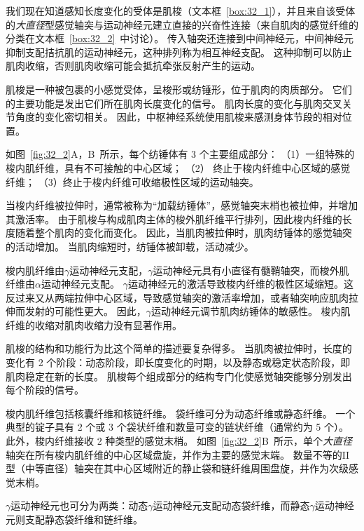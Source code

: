 我们现在知道感知长度变化的受体是肌梭（文本框~\ref{box:32_1}），并且来自该受体的\textit{大直径}型感觉轴突与运动神经元建立直接的兴奋性连接（来自肌肉的感觉纤维的分类在文本框~\ref{box:32_2}~中讨论）。
传入轴突还连接到中间神经元，中间神经元抑制支配拮抗肌的运动神经元，这种排列称为相互神经支配。
这种抑制可以防止肌肉收缩，否则肌肉收缩可能会抵抗牵张反射产生的运动。


\begin{proposition}[肌梭] \label{box:32_1}
	
	\quad \quad 肌梭是一种被包裹的小感觉受体，呈梭形或纺锤形，位于肌肉的肉质部分。
	它们的主要功能是发出它们所在肌肉长度变化的信号。
	肌肉长度的变化与肌肉交叉关节角度的变化密切相关。
	因此，中枢神经系统使用肌梭来感测身体节段的相对位置。
	
	\quad \quad 如图~\ref{fig:32_2}A，B~所示，每个纺锤体有 3 个主要组成部分：
	（1）一组特殊的梭内肌纤维，具有不可接触的中心区域；
	（2） 终止于梭内纤维中心区域的感觉纤维；
	（3）终止于梭内纤维可收缩极性区域的运动轴突。
	
	\quad \quad 当梭内纤维被拉伸时，通常被称为“加载纺锤体”，感觉轴突末梢也被拉伸，并增加其激活率。
	由于肌梭与构成肌肉主体的梭外肌纤维平行排列，因此梭内纤维的长度随着整个肌肉的变化而变化。
	因此，当肌肉被拉伸时，肌肉纺锤体的感觉轴突的活动增加。
	当肌肉缩短时，纺锤体被卸载，活动减少。
	
	\quad \quad 梭内肌纤维由$ \gamma $运动神经元支配，$ \gamma $运动神经元具有小直径有髓鞘轴突，而梭外肌纤维由$ \alpha $运动神经元支配。
	$ \gamma $运动神经元的激活导致梭内纤维的极性区域缩短。这反过来又从两端拉伸中心区域，导致感觉轴突的激活率增加，或者轴突响应肌肉拉伸而发射的可能性更大。
	因此，$ \gamma $运动神经元调节肌肉纺锤体的敏感性。
	梭内肌纤维的收缩对肌肉收缩力没有显著作用。
	
	\quad \quad 肌梭的结构和功能行为比这个简单的描述要复杂得多。
	当肌肉被拉伸时，长度的变化有 2 个阶段：动态阶段，即长度变化的时期，以及静态或稳定状态阶段，即肌肉稳定在新的长度。
	肌梭每个组成部分的结构专门化使感觉轴突能够分别发出每个阶段的信号。
	
	
	\quad \quad 梭内肌纤维包括核囊纤维和核链纤维。
	袋纤维可分为动态纤维或静态纤维。
	一个典型的锭子具有 2 个或 3 个袋状纤维和数量可变的链状纤维（通常约为 5 个）。
	此外，梭内纤维接收 2 种类型的感觉末梢。
	如图~\ref{fig:32_2}B~所示，单个\textit{大直径}轴突在所有梭内肌纤维的中心区域盘旋，并作为主要的感觉末端。
	数量不等的II型（中等直径）轴突在其中心区域附近的静止袋和链纤维周围盘旋，并作为次级感觉末梢。
	
	
	\quad \quad $ \gamma $运动神经元也可分为两类：动态$ \gamma $运动神经元支配动态袋纤维，而静态$ \gamma $运动神经元则支配静态袋纤维和链纤维。
	

\end{proposition}
